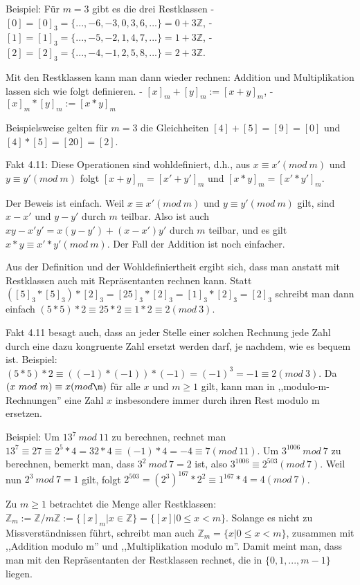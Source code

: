 \documentclass[a4paper]{article}
\begin{document}
\begin{multicols}{3}
Beispiel: Für $m=3$ gibt es die drei Restklassen
- $[0] = [0]_3 =\{...,-6,-3,0,3,6,...\}= 0 + 3\mathbb{Z}$,
- $[1] = [1]_3 =\{...,-5,-2,1,4,7,...\}= 1 + 3\mathbb{Z}$,
- $[2] = [2]_3 =\{...,-4,-1,2,5,8,...\}= 2 + 3\mathbb{Z}$.

Mit den Restklassen kann man dann wieder rechnen: Addition und Multiplikation lassen sich wie folgt definieren.
- $[x]_m+ [y]_m := [x+y]_m$,
- $[x]_m*[y]_m := [x*y]_m$

Beispielsweise gelten für $m=3$ die Gleichheiten $[4] + [5] = [9] = [0]$ und $[4]*[5] =[20] = [2]$.

Fakt 4.11: Diese Operationen sind wohldefiniert, d.h., aus $x\equiv x′(mod\ m)$ und $y\equiv y′(mod\ m)$ folgt $[x+y]_m= [x′+y′]_m$ und $[x*y]_m= [x′*y′]_m$.

Der Beweis ist einfach. Weil $x\equiv x′ (mod\ m)$ und $y\equiv y′ (mod\ m)$ gilt, sind $x-x′$ und $y-y′$ durch $m$ teilbar. Also ist auch $xy-x′y′=x(y-y′) + (x-x′)y′$ durch $m$ teilbar, und es gilt $x*y\equiv x′*y′ (mod\ m)$. Der Fall der Addition ist noch einfacher.

Aus der Definition und der Wohldefiniertheit ergibt sich, dass man anstatt mit Restklassen auch mit Repräsentanten rechnen kann. Statt $([5]_3 *[5]_3)*[2]_3 = [25]_3 *[2]_3 = [1]_3 *[2]_3 = [2]_3$ schreibt man dann einfach $(5*5)* 2 \equiv  25 * 2 \equiv  1 * 2 \equiv 2 (mod\ 3)$.

Fakt 4.11 besagt auch, dass an jeder Stelle einer solchen Rechnung jede Zahl durch eine dazu kongruente Zahl ersetzt werden darf, je nachdem, wie es bequem ist. Beispiel: $(5*5)* 2 \equiv((-1)*(-1))*(-1) = (-1)^3 =- 1 \equiv 2 (mod\ 3)$. Da $(x\ mod\ m)\equiv x(mod\m)$ für alle $x$ und $m\geq 1$ gilt, kann man in ,,modulo-m-Rechnungen'' eine Zahl $x$ insbesondere immer durch ihren Rest modulo m ersetzen.

Beispiel: Um $13^7\ mod\ 11$ zu berechnen, rechnet man $13^7\equiv 27\equiv 2^5*4 =32* 4\equiv (-1)*4 = -4\equiv 7(mod\ 11)$. Um $3^{1006}\ mod\ 7$ zu berechnen, bemerkt man, dass $3^2\ mod\ 7=2$ ist, also $3^{1006}\equiv 2^{503}(mod\ 7)$. Weil nun $2^3\ mod\ 7=1$ gilt, folgt $2^{503}=(2^3)^{167} * 2^2 \equiv  1^{167}*4=4(mod\ 7)$.

Zu $m\geq 1$ betrachtet die Menge aller Restklassen: $\mathbb{Z}_m:=\mathbb{Z}/m\mathbb{Z}:=\{[x]_m|x\in\mathbb{Z}\}=\{[x]| 0 \leq x<m\}$. Solange es nicht zu Missverständnissen führt, schreibt man auch $\mathbb{Z}_m=\{x|0 \leq x < m\}$, zusammen mit ,,Addition modulo m'' und ,,Multiplikation modulo m''. Damit meint man, dass man mit den Repräsentanten der Restklassen rechnet, die in $\{0,1 ,...,m-1\}$ liegen.


\end{multicols}
\end{document}
